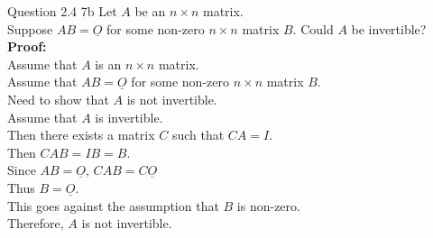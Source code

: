 \documentclass[answers,12pt,addpoints]{exam}
\begin{document}
\begin{questions}
\question Question 2.4 7b
Let $A$ be an $n \times n$ matrix. \\
Suppose $AB = \underline{O}$ for some non-zero $n \times n$ matrix $B$. Could $A$ be invertible?\\
\textbf{Proof:}\\
Assume that $A$ is an $n \times n$ matrix.\\
Assume that $AB = \underline{O}$ for some non-zero $n \times n$ matrix $B$.\\
Need to show that $A$ is not invertible.\\
Assume that $A$ is invertible.\\
Then there exists a matrix $C$ such that $CA = I$.\\
Then $CAB = IB = B$.\\
Since $AB = \underline{O}$, $CAB = C\underline{O}$\\
Thus $B = \underline{O}$.\\
This goes against the assumption that $B$ is non-zero.\\
Therefore, $A$ is not invertible.\\


\end{questions}
\end{document}

